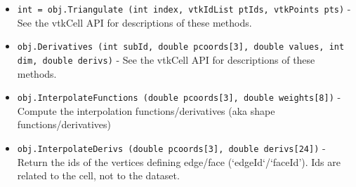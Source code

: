 \begin{itemize}
\item  \verb|int = obj.Triangulate (int index, vtkIdList ptIds, vtkPoints pts)| -  See the vtkCell API for descriptions of these methods.

\item  \verb|obj.Derivatives (int subId, double pcoords[3], double values, int dim, double derivs)| -  See the vtkCell API for descriptions of these methods.

\item  \verb|obj.InterpolateFunctions (double pcoords[3], double weights[8])| -  Compute the interpolation functions/derivatives
 (aka shape functions/derivatives)

\item  \verb|obj.InterpolateDerivs (double pcoords[3], double derivs[24])| -  Return the ids of the vertices defining edge/face (`edgeId`/`faceId').
 Ids are related to the cell, not to the dataset.

\end{itemize}
